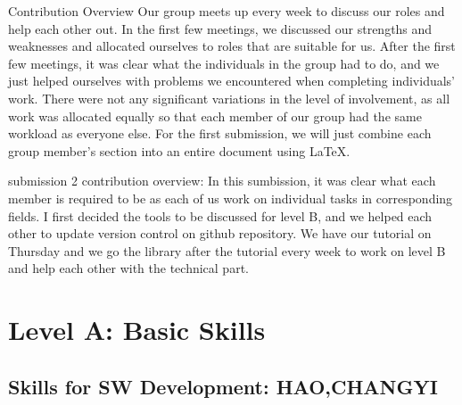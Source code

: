 \documentclass[a4paper, 11pt]{report}
\begin{document}
\begin{itemize}
\end{itemize}
Contribution Overview
Our group meets up every week to discuss our roles and help each other out. In the first few meetings, we discussed our strengths and weaknesses and allocated ourselves to roles that are suitable for us. After the first few meetings, it was clear what the individuals in the group had to do, and we just helped ourselves with problems we encountered when completing individuals’ work. There were not any significant variations in the level of involvement, as all work was allocated equally so that each member of our group had the same workload as everyone else. For the first submission, we will just combine each group member's section into an entire document using LaTeX.

submission 2 contribution overview: In this sumbission, it was clear what each member is required to be as each of us work on individual tasks in corresponding fields. I first decided the tools to be discussed for level B, and we helped each other to update version control on github repository. We have our tutorial on Thursday and we go the library after the tutorial every week to work on level B and help each other with the technical part.


\newpage
\section{Level A: Basic Skills}
\subsection{Skills for SW Development: HAO,CHANGYI}
\end{document}
